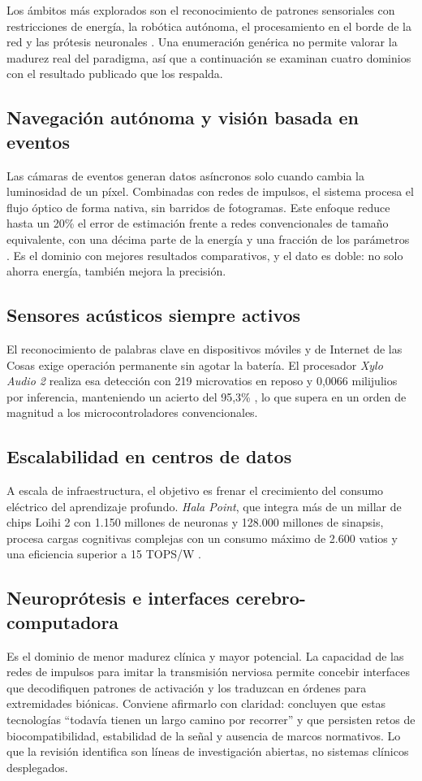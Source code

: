 \documentclass[a4paper,11pt,oneside]{book}
\begin{document}
Los ámbitos más explorados son el reconocimiento de patrones sensoriales con
restricciones de energía, la robótica autónoma, el procesamiento en el borde de
la red y las prótesis neuronales \parencite{schuman2022}. Una enumeración
genérica no permite valorar la madurez real del paradigma, así que a
continuación se examinan cuatro dominios con el resultado publicado que los
respalda.

\subsection{Navegación autónoma y visión basada en eventos}
Las cámaras de eventos generan datos asíncronos solo cuando cambia la
luminosidad de un píxel. Combinadas con redes de impulsos, el sistema procesa el
flujo óptico de forma nativa, sin barridos de fotogramas. Este enfoque reduce
hasta un 20\% el error de estimación frente a redes convencionales de tamaño
equivalente, con una décima parte de la energía y una fracción de los parámetros
\parencite{chowdhury2025}. Es el dominio con mejores resultados comparativos, y
el dato es doble: no solo ahorra energía, también mejora la precisión.

\subsection{Sensores acústicos siempre activos}
El reconocimiento de palabras clave en dispositivos móviles y de Internet de las
Cosas exige operación permanente sin agotar la batería. El procesador
\textit{Xylo Audio 2} realiza esa detección con 219 microvatios en reposo y
0,0066 milijulios por inferencia, manteniendo un acierto del 95,3\%
\parencite{bos2024}, lo que supera en un orden de magnitud a los
microcontroladores convencionales.

\subsection{Escalabilidad en centros de datos}
A escala de infraestructura, el objetivo es frenar el crecimiento del consumo
eléctrico del aprendizaje profundo. \textit{Hala Point}, que integra más de un
millar de chips Loihi 2 con 1.150 millones de neuronas y 128.000 millones de
sinapsis, procesa cargas cognitivas complejas con un consumo máximo de 2.600
vatios y una eficiencia superior a 15 TOPS/W \parencite{intel2024}.

\subsection{Neuroprótesis e interfaces cerebro-computadora}
Es el dominio de menor madurez clínica y mayor potencial. La capacidad de las
redes de impulsos para imitar la transmisión nerviosa permite concebir
interfaces que decodifiquen patrones de activación y los traduzcan en órdenes
para extremidades biónicas. Conviene afirmarlo con claridad: \textcite{donati2024}
concluyen que estas tecnologías \enquote{todavía tienen un largo camino por
recorrer} y que persisten retos de biocompatibilidad, estabilidad de la señal y
ausencia de marcos normativos. Lo que la revisión identifica son líneas de
investigación abiertas, no sistemas clínicos desplegados.
\end{document}
